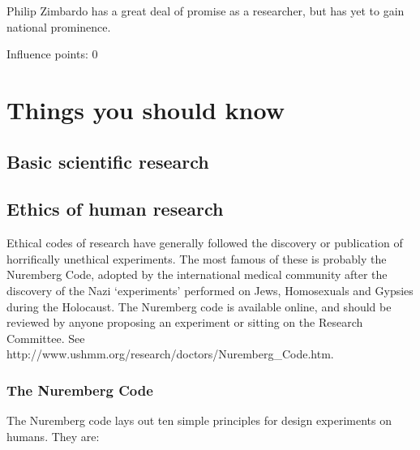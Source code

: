 Philip Zimbardo has a great deal of promise as a researcher, but has yet to gain national prominence.

Influence points: 0

\section{Things you should know}
\label{thingsyoushouldknow}

\subsection{Basic scientific research}
\label{basicscientificresearch}

\subsection{Ethics of human research}
\label{ethicsofhumanresearch}

Ethical codes of research have generally followed the discovery or publication of horrifically unethical experiments. The most famous of these is probably the Nuremberg Code, adopted by the international medical community after the discovery of the Nazi `experiments' performed on Jews, Homosexuals and Gypsies during the Holocaust. The Nuremberg code is available online, and should be reviewed by anyone proposing an experiment or sitting on the Research Committee. See http:\slash \slash www.ushmm.org\slash research\slash doctors\slash Nuremberg\_Code.htm.

\subsubsection{The Nuremberg Code}
\label{thenurembergcode}

The Nuremberg code lays out ten simple principles for design experiments on humans. They are:


